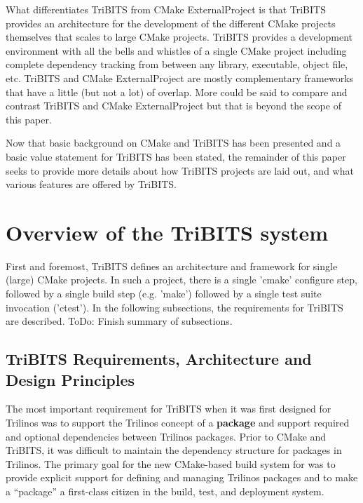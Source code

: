 \documentclass[note]{TechNote}
\begin{document}
What differentiates TriBITS from CMake ExternalProject is that TriBITS provides an architecture for the development of the different CMake projects themselves that scales to large CMake projects.  TriBITS provides a development environment with all the bells and whistles of a single CMake project including complete dependency tracking from between any library, executable, object file, etc.  TriBITS and CMake ExternalProject are mostly complementary frameworks that have a little (but not a lot) of overlap.  More could be said to compare and contrast TriBITS and CMake ExternalProject but that is beyond the scope of this paper.

Now that basic background on CMake and TriBITS has been presented and a basic value statement for TriBITS has been stated, the remainder of this paper seeks to provide more details about how TriBITS projects are laid out, and what various features are offered by TriBITS.

%
\section{Overview of the TriBITS system}
%

First and foremost, TriBITS defines an architecture and framework for single (large) CMake projects.  In such a project, there is a single 'cmake' configure step, followed by a single build step (e.g. 'make') followed by a single test suite invocation ('ctest').  In the following subsections, the requirements for TriBITS are described.  ToDo: Finish summary of subsections.

%
\subsection{TriBITS Requirements, Architecture and Design Principles}
%

The most important requirement for TriBITS when it was first designed for Trilinos was to support the Trilinos concept of a \textbf{package} and support required and optional dependencies between Trilinos packages.  Prior to CMake and TriBITS, it was difficult to maintain the dependency structure for packages in Trilinos.  The primary goal for the new CMake-based build system for was to provide explicit support for defining and managing Trilinos packages and to make a ``package'' a first-class citizen in the build, test, and deployment system.
\end{document}
